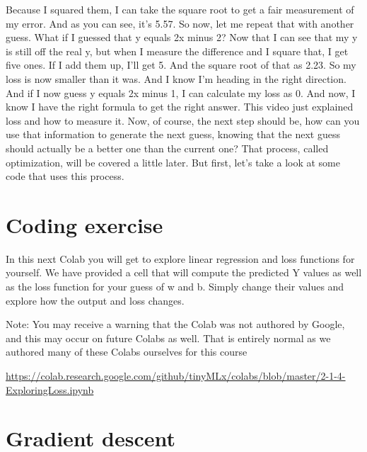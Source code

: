 Because I squared them, I can take the square root
to get a fair measurement of my error.
And as you can see, it's 5.57.
So now, let me repeat that with another guess.
What if I guessed that y equals 2x minus 2?
Now that I can see that my y is still off the real y,
but when I measure the difference and I square that, I get five ones.
If I add them up, I'll get 5.
And the square root of that as 2.23.
So my loss is now smaller than it was.
And I know I'm heading in the right direction.
And if I now guess y equals 2x minus 1, I can calculate my loss as 0.
And now, I know I have the right formula to get the right answer.
This video just explained loss and how to measure it.
Now, of course, the next step should be, how can you
use that information to generate the next guess,
knowing that the next guess should actually
be a better one than the current one?
That process, called optimization, will be covered a little later.
But first, let's take a look at some code that uses this process.

\section{Coding exercise}

In this next Colab you will get to explore linear regression and loss functions for yourself. We have provided a cell that will compute the predicted Y values as well as the loss function for your guess of w and b. Simply change their values and explore how the output and loss changes.

Note: You may receive a warning that the Colab was not authored by Google, and this may occur on future Colabs as well. That is entirely normal as we authored many of these Colabs ourselves for this course

\url{https://colab.research.google.com/github/tinyMLx/colabs/blob/master/2-1-4-ExploringLoss.ipynb}


\section{Gradient descent}


